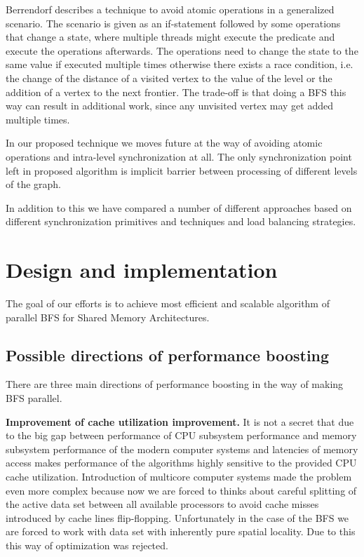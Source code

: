 \documentclass[letterpaper]{article}
\begin{document}
		Berrendorf\cite{Berrendorf:14} describes a technique to avoid atomic operations in a generalized scenario. 
		The scenario is given as an if-statement followed by some operations that change a state, where multiple threads might execute the predicate and execute the operations afterwards. 
		The operations need to change the state to the same value if executed multiple times otherwise there exists a race condition, i.e. the change of the distance of a visited vertex to the value of the level or the addition of a vertex to the next frontier. 
		The trade-off is that doing a BFS this way can result in additional work, since any unvisited vertex may get added multiple times.
		
		In our proposed technique we moves future at the way of avoiding atomic operations and intra-level synchronization at all.   
		The only synchronization point left in proposed algorithm is implicit barrier between processing of different levels of the graph.
		
		In addition to this we have compared a number of different approaches based on different synchronization primitives and techniques and load balancing strategies.
	
	\section{Design and implementation}\label{sec:deim} %
		The goal of our efforts is to achieve most efficient and scalable algorithm of parallel BFS for Shared Memory Architectures. 

		\subsection{Possible directions of performance boosting}
			There are three main directions of performance boosting in the way of making BFS parallel.
			
			\textbf{Improvement of cache utilization improvement.}
			It is not a secret that due to the big gap between performance of CPU subsystem performance and memory subsystem performance of the modern computer systems and latencies of memory access makes performance of the algorithms highly sensitive to the provided CPU cache utilization. 
			Introduction of multicore computer systems made the problem even more complex because now we are forced to thinks about careful splitting of the active data set between all available processors to avoid cache misses introduced by cache lines flip-flopping. 
			Unfortunately in the case of the BFS we are forced to work with data set with inherently pure spatial locality. 
			Due to this this way of optimization was rejected.
			
\end{document}
